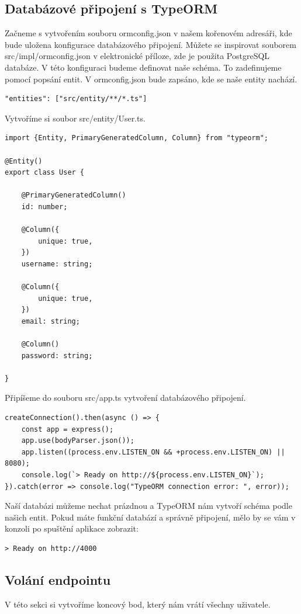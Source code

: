 \documentclass[thesis=B,czech]{FITthesis}[2012/06/26]
\begin{document}
        \subsection{Databázové připojení s TypeORM}
            Začneme s vytvořením souboru ormconfig.json v našem kořenovém adresáři, kde bude uložena konfigurace databázového připojení. Můžete se inspirovat souborem src/impl/ormconfig.json v elektronické příloze, zde je použita PostgreSQL databáze. V této konfiguraci budeme definovat naše schéma. To zadefinujeme pomocí popsání entit. V ormconfig.json bude zapsáno, kde se naše entity nachází.
            \begin{verbatim}
"entities": ["src/entity/**/*.ts"]
            \end{verbatim}
            Vytvoříme si soubor src/entity/User.ts.
            \begin{verbatim}
import {Entity, PrimaryGeneratedColumn, Column} from "typeorm";

@Entity()
export class User {

    @PrimaryGeneratedColumn()
    id: number;

    @Column({
        unique: true,
    })
    username: string;

    @Column({
        unique: true,
    })
    email: string;

    @Column()
    password: string;

}
            \end{verbatim}
            Připíšeme do souboru src/app.ts vytvoření databázového připojení.
            \begin{verbatim}
createConnection().then(async () => {
    const app = express();
    app.use(bodyParser.json());
    app.listen((process.env.LISTEN_ON && +process.env.LISTEN_ON) || 8080);
    console.log(`> Ready on http://${process.env.LISTEN_ON}`);
}).catch(error => console.log("TypeORM connection error: ", error));

            \end{verbatim}
            Naší databázi můžeme nechat prázdnou a TypeORM nám vytvoří schéma podle našich entit.
            Pokud máte funkční databází a správně připojení, mělo by se vám v konzoli po spuštění aplikace zobrazit:
            \begin{verbatim}
> Ready on http://4000
            \end{verbatim}
        \subsection{Volání endpointu}
            V této sekci si vytvoříme koncový bod, který nám vrátí všechny uživatele.
            
\end{document}
